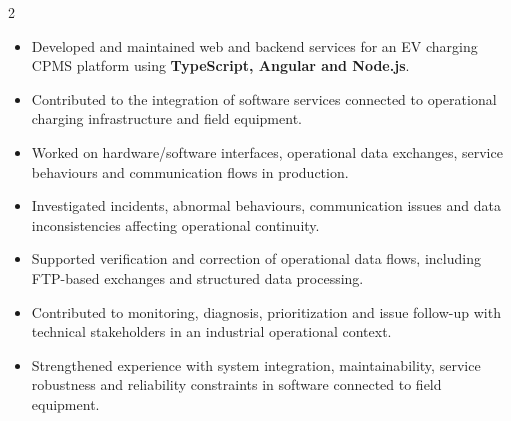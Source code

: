 \documentclass[8pt,a4paper,ragged2e,withhyper]{altacv}
\begin{document}



\makecvheader

\vspace{-0.3cm}


\begin{paracol}{2}



\begin{itemize}
\item Developed and maintained web and backend services for an EV charging CPMS platform using \textbf{TypeScript, Angular and Node.js}.
\item Contributed to the integration of software services connected to operational charging infrastructure and field equipment.
\item Worked on hardware/software interfaces, operational data exchanges, service behaviours and communication flows in production.
\item Investigated incidents, abnormal behaviours, communication issues and data inconsistencies affecting operational continuity.
\item Supported verification and correction of operational data flows, including FTP-based exchanges and structured data processing.
\item Contributed to monitoring, diagnosis, prioritization and issue follow-up with technical stakeholders in an industrial operational context.
\item Strengthened experience with system integration, maintainability, service robustness and reliability constraints in software connected to field equipment.
\end{itemize}

\divider



\end{paracol}
\end{document}
